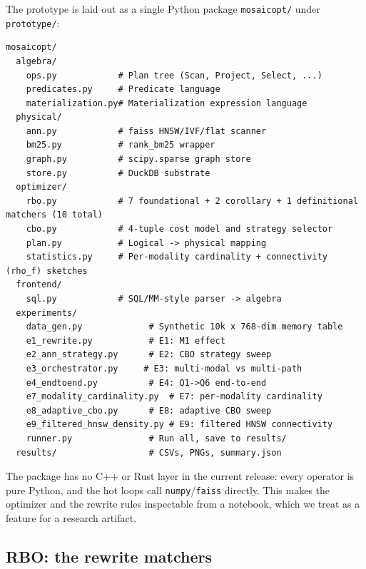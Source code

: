 \documentclass[sigconf,nonacm,review]{acmart}
\theoremstyle{plain}
\theoremstyle{definition}
\theoremstyle{remark}
\begin{document}
The prototype is laid out as a single Python package
\texttt{mosaicopt/} under \texttt{prototype/}:

\begin{verbatim}
mosaicopt/
  algebra/
    ops.py            # Plan tree (Scan, Project, Select, ...)
    predicates.py     # Predicate language
    materialization.py# Materialization expression language
  physical/
    ann.py            # faiss HNSW/IVF/flat scanner
    bm25.py           # rank_bm25 wrapper
    graph.py          # scipy.sparse graph store
    store.py          # DuckDB substrate
  optimizer/
    rbo.py            # 7 foundational + 2 corollary + 1 definitional matchers (10 total)
    cbo.py            # 4-tuple cost model and strategy selector
    plan.py           # Logical -> physical mapping
    statistics.py     # Per-modality cardinality + connectivity (rho_f) sketches
  frontend/
    sql.py            # SQL/MM-style parser -> algebra
  experiments/
    data_gen.py             # Synthetic 10k x 768-dim memory table
    e1_rewrite.py           # E1: M1 effect
    e2_ann_strategy.py      # E2: CBO strategy sweep
    e3_orchestrator.py     # E3: multi-modal vs multi-path
    e4_endtoend.py          # E4: Q1->Q6 end-to-end
    e7_modality_cardinality.py  # E7: per-modality cardinality
    e8_adaptive_cbo.py      # E8: adaptive CBO sweep
    e9_filtered_hnsw_density.py # E9: filtered HNSW connectivity
    runner.py               # Run all, save to results/
  results/                  # CSVs, PNGs, summary.json
\end{verbatim}

The package has no C++ or Rust layer in the current release:
every operator is pure Python, and the hot loops call
\texttt{numpy}/\texttt{faiss} directly. This makes the optimizer
and the rewrite rules inspectable from a notebook, which we
treat as a feature for a research artifact.

\subsection{RBO: the rewrite matchers}\label{app:proto:rbo}
\end{document}
